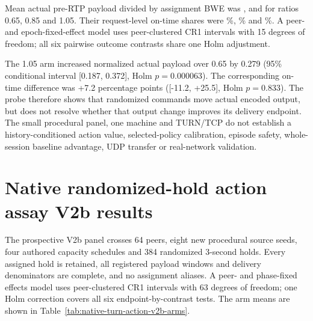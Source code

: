 \documentclass[10pt]{article}
\begin{document}
Mean actual pre-RTP payload divided by assignment BWE was
\NativeTurnActionPayloadLow{}, \NativeTurnActionPayloadMid{} and
\NativeTurnActionPayloadHigh{} for ratios 0.65, 0.85 and 1.05. Their request-level
on-time shares were \NativeTurnActionOntimeLow{}\%, \NativeTurnActionOntimeMid{}\%
and \NativeTurnActionOntimeHigh{}\%. A peer- and epoch-fixed-effect model uses
peer-clustered CR1 intervals with 15 degrees of freedom; all six pairwise
outcome contrasts share one Holm adjustment.

\begin{table}[ht]
\centering\resizebox{\linewidth}{!}{}
\caption{Factual arm means in the post-capture analysis. On-time is the registered 150 ms capture-request-to-pixel-readback proxy, not human QoE.}
\label{tab:native-turn-action-arms}
\end{table}
\begin{table}[ht]
\centering\resizebox{\linewidth}{!}{}
\caption{Proximal randomized-hold contrasts, adjusted for peer and within-peer epoch. Intervals are conditional on 16 peer clusters; Holm p values cover six endpoint/contrast tests. The analysis is exploratory and has no generalization or safety guarantee.}
\label{tab:native-turn-action-contrasts}
\end{table}

The 1.05 arm increased normalized actual payload over 0.65 by 0.279
(95\% conditional interval [0.187, 0.372], Holm $p=0.000063$). The corresponding
on-time difference was +7.2 percentage points ([-11.2, +25.5], Holm $p=0.833$).
The probe therefore shows that randomized commands move actual encoded output,
but does not resolve whether that output change improves its delivery endpoint.
The small procedural panel, one machine and TURN/TCP do not establish a
history-conditioned action value, selected-policy calibration, episode safety,
whole-session baseline advantage, UDP transfer or real-network validation.

\section{Native randomized-hold action assay V2b results}
\label{app:native-turn-action-v2b}

The prospective V2b panel crosses 64 peers, eight new procedural source seeds,
four authored capacity schedules and 384 randomized 3-second holds. Every
assigned hold is retained, all registered payload windows and delivery
denominators are complete, and no assignment aliases. A peer- and phase-fixed
effects model uses peer-clustered CR1 intervals with 63 degrees of freedom; one
Holm correction covers all six endpoint-by-contrast tests. The arm means are
shown in Table~\ref{tab:native-turn-action-v2b-arms}.
\end{document}
